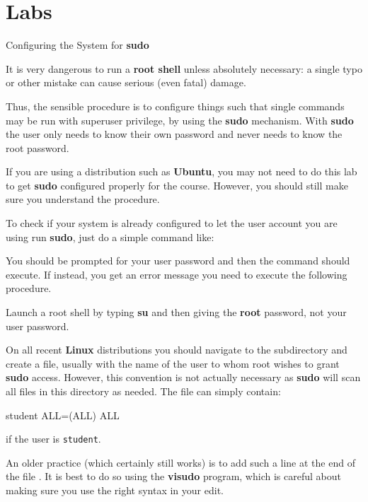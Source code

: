 \clearpage\section{Labs}\begin{Lab}

\begin{exe} {Configuring the System for \textbf{sudo} }

   It is very dangerous to run a \textbf{root shell}
   unless absolutely necessary: a single typo or other
   mistake can cause serious (even fatal) damage.

   Thus, the sensible procedure is to configure things
   such that single commands may be run with superuser
   privilege, by using the \textbf{sudo} mechanism.  With
   \textbf{sudo} the user only needs to know their own
   password and never needs to know the root password.

   If you are using a distribution such as
   \textbf{Ubuntu}, you may not need to do this lab to
   get \textbf{sudo} configured properly for the
   course. However, you should still make sure you
   understand the procedure.

   To check if your system is already configured to let
   the user account you are using run \textbf{sudo}, just
   do a simple command like:

   You should be prompted for your user password and then
   the command should execute.  If instead, you get an
   error message you need to execute the following procedure.

   Launch a root shell by typing \textbf{su} and then giving the
   \textbf{root} password, not your user password.

   On all recent \textbf{Linux} distributions you should
   navigate to the  subdirectory
   and create a file, usually with the name of the user
   to whom root wishes to grant \textbf{sudo}
   access. However, this convention is not actually
   necessary as \textbf{sudo} will scan all files in this
   directory as needed.  The file can simply contain:
   \begin{raw}
student ALL=(ALL)  ALL
   \end{raw}

   if the user is \verb?student?.

   An older practice (which certainly still works) is to add
   such a line at the end of the file .
   It is best to do so using the \textbf{visudo} program,
   which is careful about making sure you use the right syntax
   in your edit.


\end{exe}
\end{Lab}
